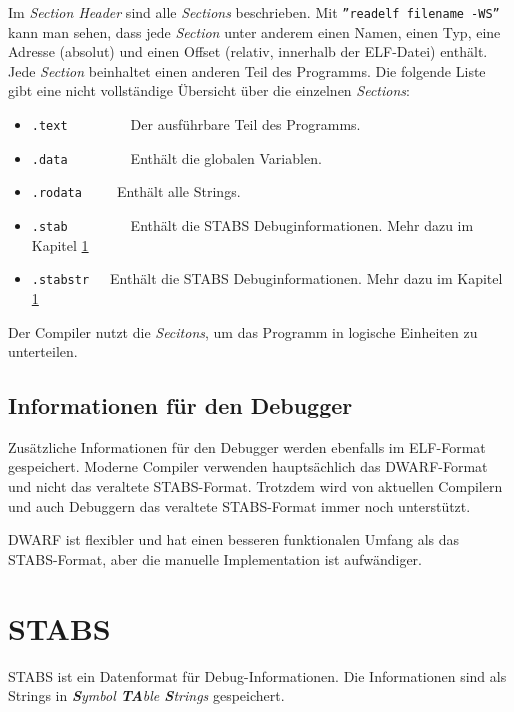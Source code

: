 Im \textit{Section Header} sind alle \textit{Sections} beschrieben.
Mit \texttt{''readelf filename -WS''} kann man sehen, dass jede \textit{Section} unter anderem einen Namen, einen Typ, eine Adresse (absolut) und einen Offset (relativ, innerhalb der ELF-Datei) enthält.
Jede \textit{Section} beinhaltet einen anderen Teil des Programms.
Die folgende Liste gibt eine nicht vollständige Übersicht über die einzelnen \textit{Sections}:
\begin{itemize}
	\item \texttt{.text}\ \ \ \ \ \ \ \ \ Der ausführbare Teil des Programms.
	\item \texttt{.data}\ \ \ \ \ \ \ \ \ Enthält die globalen Variablen.
	\item \texttt{.rodata}\ \ \ \ \ Enthält alle Strings.
	\item \texttt{.stab}\ \ \ \ \ \ \ \ \ Enthält die STABS Debuginformationen. Mehr dazu im Kapitel \ref{label:stabs} 
	\item \texttt{.stabstr}\ \ \ Enthält die STABS Debuginformationen. Mehr dazu im Kapitel \ref{label:stabs} 
\end{itemize}
Der Compiler nutzt die \textit{Secitons}, um das Programm in logische Einheiten zu unterteilen.


\subsection{Informationen für den Debugger}
Zusätzliche Informationen für den Debugger werden ebenfalls im ELF-Format gespeichert.
Moderne Compiler verwenden hauptsächlich das DWARF-Format und nicht das veraltete STABS-Format.
Trotzdem wird von aktuellen Compilern und auch Debuggern das veraltete STABS-Format immer noch unterstützt.

DWARF ist flexibler und hat einen besseren funktionalen Umfang als das STABS-Format, aber die manuelle Implementation ist aufwändiger.



\section{STABS}
\label{label:stabs}
STABS ist ein Datenformat für Debug-Informationen.
Die Informationen sind als Strings in \textit{\textbf{S}ymbol \textbf{TA}ble \textbf{S}trings} gespeichert.

